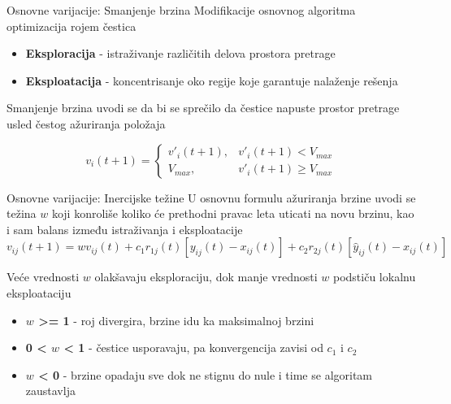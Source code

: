 \documentclass{beamer}
\begin{document}
\begin{frame}{Osnovne varijacije: Smanjenje brzina}
Modifikacije osnovnog algoritma optimizacija rojem čestica

\begin{itemize}
    \item \textbf{Eksploracija} - istraživanje različitih delova prostora pretrage
    \item \textbf{Eksploatacija}  -  koncentrisanje oko regije koje garantuje nalaženje rešenja
\end{itemize}
Smanjenje brzina uvodi se da bi se sprečilo da čestice napuste  prostor pretrage usled čestog ažuriranja položaja


\begin{equation}
    v_i(t+1) = \begin{cases}
                
            v'_i(t+1),  &  v'_i(t+1) < V_{max}\\
            V_{max},  &   v'_i(t+1) \geq V_{max}
           
             \end{cases}
\end{equation}

\end{frame}

\begin{frame}{Osnovne varijacije: Inercijske težine}
U osnovnu formulu ažuriranja brzine uvodi se težina $w$ koji konroliše koliko će prethodni pravac leta uticati na novu brzinu, kao i sam balans između istraživanja i eksploatacije
\[v_{ij}(t+1) = wv_{ij}(t) + c_1r_{1j}(t)[y_{ij}(t) - x_{ij}(t)] + c_2r_{2j}(t)[\hat{y}_{ij}(t) - x_{ij}(t)] \]

Veće vrednosti $w$ olakšavaju eksploraciju, dok manje vrednosti $w$ podstiču lokalnu eksploataciju

\begin{itemize}
    \item \textbf{$w$ >= 1} - roj divergira, brzine idu ka maksimalnoj brzini
    \item \textbf{0 < $w$ < 1}  -  čestice usporavaju, pa konvergencija zavisi od $c_1$ i $c_2$
    \item \textbf{$w$ < 0} -  brzine opadaju sve dok ne stignu do nule i time se algoritam zaustavlja
\end{itemize}

\end{frame}
\end{document}
